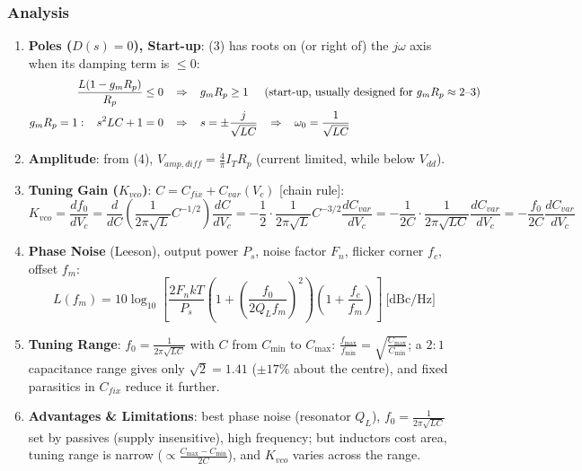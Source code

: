 \subsubsection{Analysis}
\begin{enumerate}
  \item \textbf{Poles (\(D(s) = 0\)), Start-up}: (3) has roots on (or right of) the \(j\omega\) axis when its
    damping term is \(\leq 0\):
\begin{align*}
  \frac{L(1 - g_m R_p)}{R_p} \leq 0 \hspace{0.3cm} &\Rightarrow \hspace{0.3cm} g_m R_p \geq 1 \hspace{0.5cm} \text{(start-up, usually designed for } g_m R_p \approx 2\text{--}3) \\
  g_m R_p = 1: \hspace{0.3cm} s^2 LC + 1 = 0 \hspace{0.3cm} &\Rightarrow \hspace{0.3cm} s = \pm\frac{j}{\sqrt{LC}} \hspace{0.3cm} \Rightarrow \hspace{0.3cm} \omega_0 = \frac{1}{\sqrt{LC}}
\end{align*}
  \item \textbf{Amplitude}: from (4), \(V_{amp,diff} = \frac{4}{\pi} I_T R_p\) (current limited, while below \(V_{dd}\)).
  \item \textbf{Tuning Gain (\(K_{vco}\))}: \(C = C_{fix} + C_{var}(V_c)\) [chain rule]:
\[
  K_{vco} = \frac{df_0}{dV_c} = \frac{d}{dC}\left(\frac{1}{2\pi\sqrt{L}}C^{-1/2}\right)\frac{dC}{dV_c} = -\frac{1}{2}\cdot\frac{1}{2\pi\sqrt{L}}C^{-3/2}\frac{dC_{var}}{dV_c} = -\frac{1}{2C}\cdot\frac{1}{2\pi\sqrt{LC}}\frac{dC_{var}}{dV_c} = -\frac{f_0}{2C}\frac{dC_{var}}{dV_c}
\]
  \item \textbf{Phase Noise} (Leeson), output power \(P_s\), noise factor \(F_n\), flicker corner \(f_c\),
    offset \(f_m\):
\[
  L(f_m) = 10\log_{10}\left[\frac{2 F_n k T}{P_s}\left(1 + \left(\frac{f_0}{2Q_L f_m}\right)^2\right)\left(1 + \frac{f_c}{f_m}\right)\right] \ \text{[dBc/Hz]}
\]
  \item \textbf{Tuning Range}: \(f_0 = \frac{1}{2\pi\sqrt{LC}}\) with \(C\) from \(C_{\min}\) to \(C_{\max}\):
    \(\frac{f_{\max}}{f_{\min}} = \sqrt{\frac{C_{\max}}{C_{\min}}}\); a \(2:1\) capacitance range gives only \(\sqrt{2} = 1.41\) (\(\pm 17\%\) about the centre),
    and fixed parasitics in \(C_{fix}\) reduce it further.
  \item \textbf{Advantages \& Limitations}: best phase noise (resonator \(Q_L\)), \(f_0 = \frac{1}{2\pi\sqrt{LC}}\) set by
    passives (supply insensitive), high frequency; but inductors cost area, tuning range is narrow
    (\(\propto \frac{C_{\max} - C_{\min}}{2C}\)), and \(K_{vco}\) varies across the range.
\end{enumerate}

